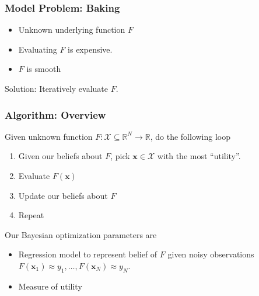 \documentclass{beamer}
\begin{document}
\begin{frame}
    \frametitle{Model Problem: Baking}
    \begin{itemize}
        \item Unknown underlying function $F$ %
            \pause
        \item Evaluating $F$ is expensive.
            \pause
        \item $F$ is smooth
            \pause
    \end{itemize}
    Solution: Iteratively evaluate $F$.
\end{frame}

\begin{frame}
    \frametitle{Algorithm: Overview}
    Given unknown function $F: \mathcal{X} \subseteq \mathbb{R}^{N} \to \mathbb{R}$, do the following loop
    \begin{enumerate}
        \item Given our beliefs about $F$, pick $\mathbf{x} \in \mathcal{X}$ with the most ``utility''.
            \pause
        \item Evaluate $F(\mathbf{x})$
            \pause
        \item Update our beliefs about $F$
            \pause
        \item Repeat
            \pause
    \end{enumerate}

    Our Bayesian optimization parameters are
    \pause
    \begin{itemize}
        \item Regression model to represent belief of $F$ given noisy observations $F(\mathbf{x}_1) \approx y_1, \dots, F(\mathbf{x}_N) \approx y_N$.
            \pause
        \item Measure of utility
    \end{itemize}
\end{frame}
\end{document}
